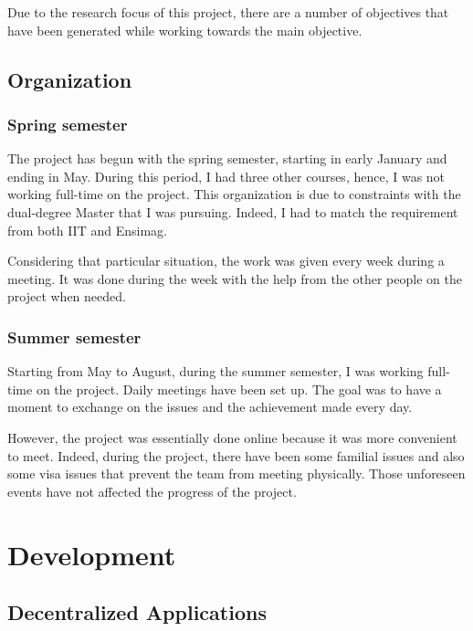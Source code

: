 \documentclass{iitFirstPage}
\begin{document}
    Due to the research focus of this project, there are a number of objectives that have been generated while working towards the main objective.

    \subsection{Organization}

    \subsubsection{Spring semester}

    The project has begun with the spring semester, starting in early January and ending in May.
    During this period, I had three other courses, hence, I was not working full-time on the project.
    This organization is due to constraints with the dual-degree Master that I was pursuing.
    Indeed, I had to match the requirement from both IIT and Ensimag.

    Considering that particular situation, the work was given every week during a meeting.
    It was done during the week with the help from the other people on the project when needed.

    \subsubsection{Summer semester}

    Starting from May to August, during the summer semester, I was working full-time on the project.
    Daily meetings have been set up.
    The goal was to have a moment to exchange on the issues and the achievement made every day.

    However, the project was essentially done online because it was more convenient to meet.
    Indeed, during the project, there have been some familial issues and also some visa issues that prevent the team from meeting physically.
    Those unforeseen events have not affected the progress of the project.

    \section{Development}

    \subsection{Decentralized Applications}
\end{document}
